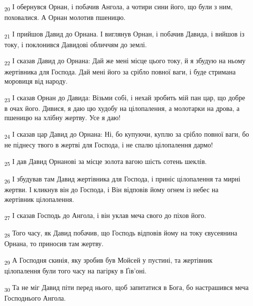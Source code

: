 \begin{tcolorbox}
\textsubscript{20} І обернувся Орнан, і побачив Ангола, а чотири сини його, що були з ним, поховалися. А Орнан молотив пшеницю.
\end{tcolorbox}
\begin{tcolorbox}
\textsubscript{21} І прийшов Давид до Орнана. І виглянув Орнан, і побачив Давида, і вийшов із току, і поклонився Давидові обличчям до землі.
\end{tcolorbox}
\begin{tcolorbox}
\textsubscript{22} І сказав Давид до Орнана: Дай же мені місце цього току, й я збудую на ньому жертівника для Господа. Дай мені його за срібло повної ваги, і буде стримана моровиця від народу.
\end{tcolorbox}
\begin{tcolorbox}
\textsubscript{23} І сказав Орнан до Давида: Візьми собі, і нехай зробить мій пан цар, що добре в очах його. Дивися, я даю цю худобу на цілопалення, а молотарки на дрова, а пшеницю на хлібну жертву. Усе я даю!
\end{tcolorbox}
\begin{tcolorbox}
\textsubscript{24} І сказав цар Давид до Орнана: Ні, бо купуючи, куплю за срібло повної ваги, бо не піднесу твого в жертві для Господа, і не спалю цілопалення дармо!
\end{tcolorbox}
\begin{tcolorbox}
\textsubscript{25} І дав Давид Орнанові за місце золота вагою шість сотень шеклів.
\end{tcolorbox}
\begin{tcolorbox}
\textsubscript{26} І збудував там Давид жертівника для Господа, і приніс цілопалення та мирні жертви. І кликнув він до Господа, і Він відповів йому огнем із небес на жертівник цілопалення.
\end{tcolorbox}
\begin{tcolorbox}
\textsubscript{27} І сказав Господь до Ангола, і він уклав меча свого до піхов його.
\end{tcolorbox}
\begin{tcolorbox}
\textsubscript{28} Того часу, як Давид побачив, що Господь відповів йому на току євусеянина Орнана, то приносив там жертву.
\end{tcolorbox}
\begin{tcolorbox}
\textsubscript{29} А Господня скинія, яку зробив був Мойсей у пустині, та жертівник цілопалення були того часу на пагірку в Ґів'оні.
\end{tcolorbox}
\begin{tcolorbox}
\textsubscript{30} Та не міг Давид піти перед нього, щоб запитатися в Бога, бо настрашився меча Господнього Ангола.
\end{tcolorbox}
